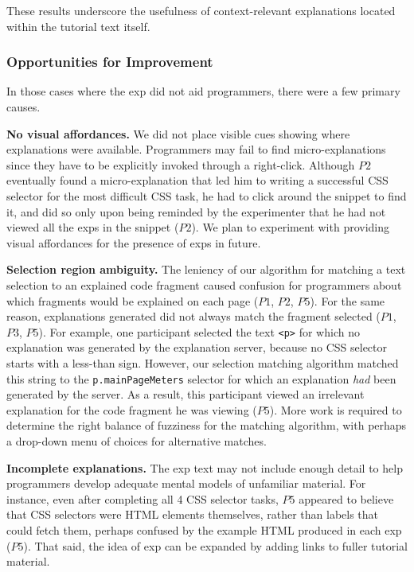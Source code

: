 These results underscore the usefulness of context-relevant explanations located within the tutorial text itself.

\subsubsection{Opportunities for Improvement}
In those cases where the \gls{exp} did not aid programmers, there were a few primary causes.

{\bf No visual affordances.} We did not place  visible cues showing where explanations were available.
Programmers may fail to find micro-explanations since they have to be explicitly invoked through a right-click.
Although $P2$ eventually found a micro-explanation that led him to writing a successful CSS selector for the most difficult CSS task, he had to click around the snippet to find it, and did so only upon being reminded by the experimenter that he had not viewed all the \glspl{exp} in the snippet ($P2$).  We plan to experiment with providing visual affordances for the presence of \glspl{exp} in future.


{\bf Selection region ambiguity.}
The leniency of our algorithm for matching a text selection to an explained code fragment caused confusion for programmers about which fragments would be explained on each page ($P1$, $P2$, $P5$).
For the same reason, explanations generated did not always match the fragment selected ($P1$, $P3$, $P5$).
For example, one participant selected the text \texttt{<p>} for which no explanation was generated by the explanation server, because no CSS selector starts with a less-than sign.
However, our selection matching algorithm matched this string to the \texttt{p.mainPageMeters} selector for which an explanation \emph{had} been generated by the server.  As a result, this participant viewed an irrelevant explanation for the code fragment he was viewing ($P5$).  More work is required to determine the right balance of fuzziness for the matching algorithm, with perhaps a drop-down menu of choices for alternative matches.

{\bf Incomplete explanations.} The  \gls{exp} text may not include enough detail to help programmers  develop adequate mental models of unfamiliar material. For instance,
even after completing all 4 CSS selector tasks, $P5$ appeared to believe that CSS selectors were HTML elements themselves, rather than labels that could fetch them, perhaps confused by the example HTML produced in each \gls{exp} ($P5$).  That said, the idea of \gls{exp} can be expanded by adding links to fuller tutorial material.